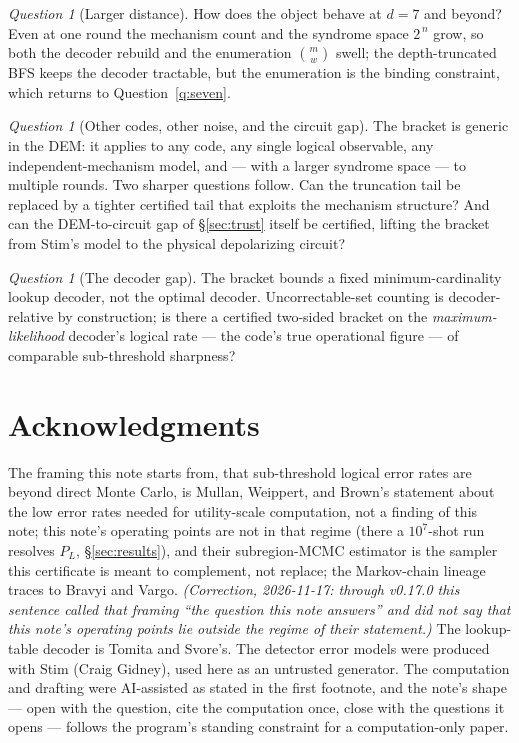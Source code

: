 \documentclass[11pt]{amsart}
\newcommand{\PL}{P_{L}}
\theoremstyle{plain}
\theoremstyle{definition}
\theoremstyle{remark}
\newtheorem{question}[theorem]{Question}
\begin{document}
\begin{question}[Larger distance]\label{q:scale}
How does the object behave at $d=7$ and beyond? Even at one round the mechanism
count and the syndrome space $2^{\,n}$ grow, so both the decoder rebuild and the
enumeration $\binom{m}{w}$ swell; the depth-truncated BFS keeps the decoder
tractable, but the enumeration is the binding constraint, which returns to
Question~\ref{q:seven}.
\end{question}

\begin{question}[Other codes, other noise, and the circuit gap]\label{q:models}
The bracket is generic in the DEM: it applies to any code, any single logical
observable, any independent-mechanism model, and --- with a larger syndrome
space --- to multiple rounds. Two sharper questions follow. Can the truncation
tail be replaced by a tighter certified tail that exploits the mechanism
structure? And can the DEM-to-circuit gap of \S\ref{sec:trust} itself be
certified, lifting the bracket from Stim's model to the physical depolarizing
circuit?
\end{question}

\begin{question}[The decoder gap]\label{q:decoder}
The bracket bounds a fixed minimum-cardinality lookup decoder, not the optimal
decoder. Uncorrectable-set counting is decoder-relative by construction; is
there a certified two-sided bracket on the \emph{maximum-likelihood} decoder's
logical rate --- the code's true operational figure --- of comparable
sub-threshold sharpness?
\end{question}

\section*{Acknowledgments}

The framing this note starts from, that sub-threshold logical error rates are
beyond direct Monte Carlo, is Mullan, Weippert, and Brown's statement about
the low error rates needed for utility-scale computation, not a finding of this
note; this note's operating points are not in that regime (there a
$10^7$-shot run resolves $\PL$, \S\ref{sec:results}), and their
subregion-MCMC estimator is the sampler this certificate is meant to complement,
not replace; the Markov-chain lineage traces to Bravyi and Vargo. \emph{(Correction, 2026-11-17: through v0.17.0 this sentence called that framing ``the question this note answers'' and did not say that this note's operating points lie outside the regime of their statement.)} The
lookup-table decoder is Tomita and Svore's. The detector error models were
produced with Stim (Craig Gidney), used here as an untrusted generator. The
computation and drafting were AI-assisted as stated in the first footnote, and
the note's shape --- open with the question, cite the computation once, close
with the questions it opens --- follows the program's standing constraint for a
computation-only paper.
\end{document}
